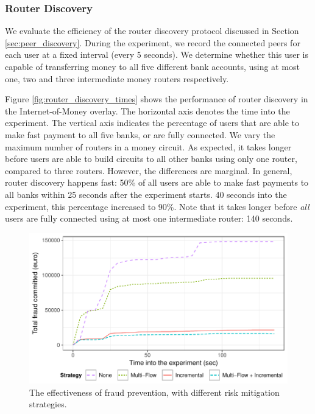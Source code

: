 \subsubsection*{Router Discovery}
\label{sec:router_discovery_evaluation}
We evaluate the efficiency of the router discovery protocol discussed in Section \ref{sec:peer_discovery}.
During the experiment, we record the connected peers for each user at a fixed interval (every 5 seconds).
We determine whether this user is capable of transferring money to all five different bank accounts, using at most one, two and three intermediate money routers respectively.

Figure \ref{fig:router_discovery_times} shows the performance of router discovery in the Internet-of-Money overlay.
The horizontal axis denotes the time into the experiment.
The vertical axis indicates the percentage of users that are able to make fast payment to all five banks, or are fully connected.
We vary the maximum number of routers in a money circuit.
As expected, it takes longer before users are able to build circuits to all other banks using only one router, compared to three routers.
However, the differences are marginal.
In general, router discovery happens fast: 50\% of all users are able to make fast payments to all banks within 25 seconds after the experiment starts.
40 seconds into the experiment, this percentage increased to 90\%.
Note that it takes longer before \emph{all} users are fully connected using at most one intermediate router: 140 seconds.

\begin{figure}[!t]
	\centering
	\includegraphics[width=.8\linewidth]{iom/assets/fraud_experiment}
	\caption{The effectiveness of fraud prevention, with different risk mitigation strategies.}
	\label{fig:fraud_experiment}
\end{figure}

